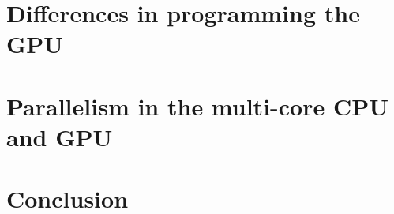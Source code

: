 \documentclass[a4paper,11pt]{article}
\begin{document}



\section{Differences in programming the GPU} %
\label{sec:differences_in_programming_the_gpu}



\section{Parallelism in the multi-core CPU and GPU} %
\label{sec:parallelism_in_the_multi_core_cpu_and_gpu}



\section{Conclusion} %
\label{sec:conclusion}





\end{document}
